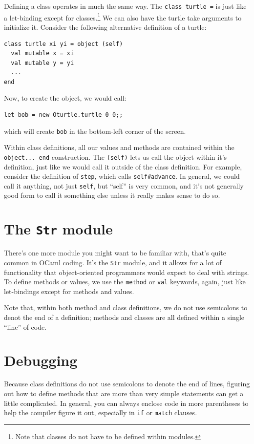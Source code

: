 \documentclass[10pt]{book}
\begin{document}
{Defining a class operates in much the same way. The {\tt class turtle =} is just like a let-binding except for classes.\footnote{Note that classes do not have to be defined within modules.} We can also have the turtle take arguments to initialize it. Consider the following alternative definition of a turtle:

\beforeverb
\begin{verbatim}
class turtle xi yi = object (self)
  val mutable x = xi
  val mutable y = yi
  ...
end
\end{verbatim}
\afterverb

Now, to create the object, we would call:
\beforeverb
\begin{verbatim}
let bob = new Oturtle.turtle 0 0;;
\end{verbatim}
\afterverb
which will create {\tt bob} in the bottom-left corner of the screen.

Within class definitions, all our values and methods are contained
within the {\tt object... end} construction. The {\tt (self)} lets us
call the object within it's definition, just like we would call it
outside of the class definition. For example, consider the definition
of {\tt step}, which calls {\tt self\#advance}. In general, we could
call it anything, not just {\tt self}, but ``self'' is very common,
and it's not generally good form to call it something else unless it
really makes sense to do so.

\section{The {\tt Str} module}

There's one more module you might want to be familiar with, that's quite common in OCaml coding. It's the {\tt Str} module, and it allows for a lot of functionality that object-oriented programmers would expect to deal with strings.
To define methods or values, we use the {\tt method} or {\tt val} keywords, again, just like let-bindings except for methods and values.

Note that, within both method and class definitions, we do not use semicolons to denot the end of a definition; methods and classes are all defined within a single ``line'' of code.

\section{Debugging}

Because class definitions do not use semicolons to denote the end of lines, figuring out how to define methods that are more than very simple statements can get a little complicated. In general, you can always enclose code in more parentheses to help the compiler figure it out, especially in {\tt if} or {\tt match} clauses.

}
\end{document}
